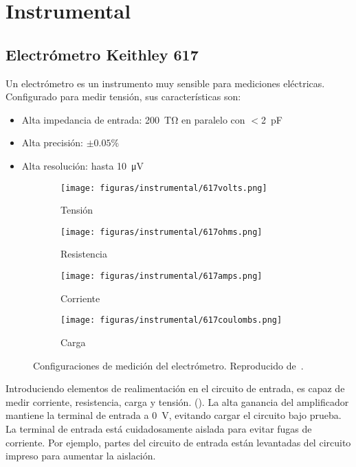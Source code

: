 \section{Instrumental}
\subsection{Electrómetro Keithley 617}
Un electrómetro es un instrumento muy sensible para mediciones eléctricas.
Configurado para medir tensión, sus características son:
\begin{itemize}
    \item Alta impedancia de entrada:
\SI{200}{\tera\ohm} en paralelo con $<$\SI{2}{\pico\farad}
\item Alta precisión: $\pm0.05\%$
\item Alta resolución: hasta \SI{10}{\micro\volt}
\end{itemize}
\begin{figure}[p]
    \begin{subfigure}[b]{\textwidth}
    \centering
        \texttt{[image: figuras/instrumental/617volts.png]}
        \caption{Tensión}
    \end{subfigure}
    \begin{subfigure}[b]{\textwidth}
    \centering
        \texttt{[image: figuras/instrumental/617ohms.png]}
        \caption{Resistencia}
    \end{subfigure}
    \begin{subfigure}[b]{\textwidth}
    \centering
        \texttt{[image: figuras/instrumental/617amps.png]}
        \caption{Corriente}
    \end{subfigure}
    \begin{subfigure}[b]{\textwidth}
    \centering
        \texttt{[image: figuras/instrumental/617coulombs.png]}
        \caption{Carga}
    \end{subfigure}
    \caption{Configuraciones de medición del electrómetro.
    Reproducido de~\cite{keithley_instruments_inc._keithley_1984}.}
    \label{fig:keithley617}
\end{figure}
Introduciendo elementos de realimentación en el circuito de entrada,
es capaz de medir corriente, resistencia, carga y tensión.
().
La alta ganancia del amplificador mantiene la terminal de entrada a
\SI{0}{\volt}, 
evitando cargar el circuito bajo prueba.
La terminal de entrada está cuidadosamente aislada 
para evitar fugas de corriente. 
Por ejemplo, partes del circuito de entrada 
están levantadas del circuito impreso para aumentar la aislación.
